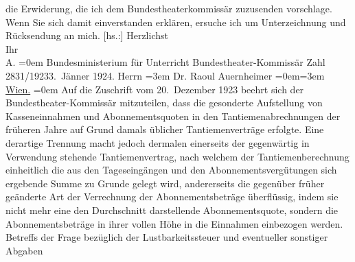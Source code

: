 \begin{ledgroupsized}[t]{13cm}
               die Erwiderung, die ich dem Bundestheaterkommissär zuzusenden vorschlage. Wenn Sie sich damit
               einverstanden erklären, ersuche ich um Unterzeichnung und Rücksendung an mich.\pend
           \pstart
           {[}hs.:{]} Herzlichst{\\[\baselineskip]}Ihr{\\[\baselineskip]}\spacefill\mbox{A.}\pend
           \leftskip=0em{}{\bigskip}\pstart
           \noindent{}\raggedleft{}{\pb}Bundesministerium für Unterricht\pend
           \pstart
           \noindent{}\raggedleft{}Bundestheater-Kommissär\pend
           \pstart
           \noindent{}Zahl 2831/1923\hfill 3. Jänner 1924.\pend
           \pstart
           Herrn\pend
           \leftskip=3em{}\pstart
           \noindent{}Dr. Raoul Auernheimer\pend
           \leftskip=0em{}\leftskip=3em{}\pstart
           \uline{Wien.}\pend
           \leftskip=0em{}\pstart
           Auf die Zuschrift vom 20. Dezember 1923 beehrt sich der Bundestheater-Kommissär
               mitzuteilen, dass die gesonderte Aufstellung von Kasseneinnahmen und
               Abonnementsquoten in den Tantiemenabrechnungen der früheren Jahre auf Grund damals
               üblicher Tantiemenverträge erfolgte. Eine derartige Trennung macht jedoch dermalen
               einerseits der gegenwärtig in Verwendung stehende Tantiemenvertrag, nach welchem der
               Tantiemenberechnung einheitlich die aus den Tageseingängen und den
               Abonnementsvergütungen sich ergebende Summe zu Grunde gelegt wird, andererseits die
               gegenüber früher geänderte Art der Verrechnung der Abonnementsbeträge überflüssig,
                  {\pb}indem sie nicht mehr eine den Durchschnitt
               darstellende  Abonnementsquote, sondern die
               Abonnementsbeträge in ihrer vollen Höhe in die Einnahmen einbezogen werden.\pend
           \pstart
           Betreffs der Frage bezüglich der Lustbarkeitssteuer und eventueller sonstiger Abgaben

\end{ledgroupsized}
